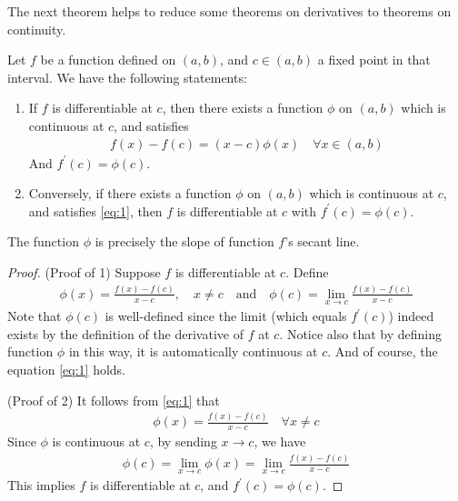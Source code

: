 \documentclass[thmcnt=section, 12pt]{my-elegantbook}
\begin{document}
The next theorem helps to reduce some theorems on derivatives to theorems on continuity.

\begin{theorem} \label{thm:1}
    Let $f$ be a function defined on $(a, b)$, and $c \in (a, b)$ a fixed point in that interval. We have the following statements:
    \begin{enumerate}
        \item If $f$ is differentiable at $c$, then there exists a function $\phi$ on $(a, b)$ which is continuous at $c$, and satisfies 
        \begin{align}
            f(x) - f(c) = (x - c) \phi(x)
            \quad \forall x \in (a, b)
            \label{eq:1}
        \end{align}
        And $f^\prime(c) = \phi(c)$.
        \item Conversely, if there exists a function $\phi$ on $(a, b)$ which is continuous at $c$, and satisfies \eqref{eq:1}, then $f$ is differentiable at $c$ with $f^\prime(c) = \phi(c)$.
    \end{enumerate}
\end{theorem}

The function $\phi$ is precisely the slope of function $f$'s secant line.

\begin{proof}
    (Proof of 1) Suppose $f$ is differentiable at $c$. Define 
    \begin{align*}
        \phi(x) = \frac{f(x) - f(c)}{x - c}, 
        \quad x \neq c
        \quad\text{and}\quad 
        \phi(c) = \lim_{x \to c} \frac{f(x) - f(c)}{x - c}
    \end{align*}
    Note that $\phi(c)$ is well-defined since the limit (which equals $f^\prime(c)$) indeed exists by the definition of the derivative of $f$ at $c$. Notice also that by defining function $\phi$ in this way, it is automatically continuous at $c$. And of course, the equation \eqref{eq:1} holds.

    (Proof of 2) It follows from \eqref{eq:1} that 
    \begin{align*}
        \phi(x) = \frac{f(x) - f(c)}{x - c}
        \quad \forall x \neq c
    \end{align*}
    Since $\phi$ is continuous at $c$, by sending $x \to c$, we have 
    \begin{align*}
        \phi(c) = \lim_{x \to c} \phi(x)
        = \lim_{x \to c} \frac{f(x) - f(c)}{x - c}
    \end{align*}
    This implies $f$ is differentiable at $c$, and $f^\prime(c) = \phi(c)$.
\end{proof}
\end{document}
